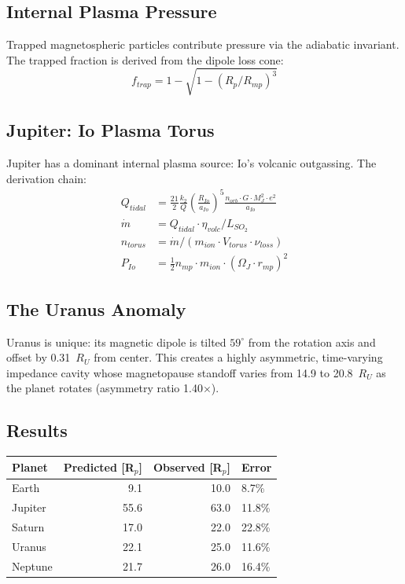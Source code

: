 \subsection{Internal Plasma Pressure}

Trapped magnetospheric particles contribute pressure via the adiabatic
invariant.  The trapped fraction is derived from the dipole loss cone:
\begin{equation}
    f_{trap} = 1 - \sqrt{1 - (R_p/R_{mp})^3}
\end{equation}

\subsection{Jupiter: Io Plasma Torus}

Jupiter has a dominant internal plasma source: Io's volcanic
outgassing.  The derivation chain:
\begin{align}
    Q_{tidal} &= \frac{21}{2}\frac{k_2}{Q}\left(\frac{R_{Io}}{a_{Io}}\right)^5
    \frac{n_{orb} \cdot G \cdot M_J^2 \cdot e^2}{a_{Io}} \\
    \dot{m} &= Q_{tidal} \cdot \eta_{volc} / L_{SO_2} \\
    n_{torus} &= \dot{m} / (m_{ion} \cdot V_{torus} \cdot \nu_{loss}) \\
    P_{Io} &= \frac{1}{2} n_{mp} \cdot m_{ion} \cdot (\Omega_J \cdot r_{mp})^2
\end{align}

\subsection{The Uranus Anomaly}

Uranus is unique: its magnetic dipole is tilted $59^\circ$ from
the rotation axis and offset by 0.31~$R_U$ from center.  This
creates a highly asymmetric, time-varying impedance cavity whose
magnetopause standoff varies from 14.9 to 20.8~$R_U$ as the
planet rotates (asymmetry ratio 1.40$\times$).

\subsection{Results}

\begin{center}
\small
\begin{tabular}{lrrl}
\toprule
\textbf{Planet} & \textbf{Predicted [R$_p$]} & \textbf{Observed [R$_p$]} & \textbf{Error} \\
\midrule
Earth   &  9.1 & 10.0 &  8.7\% \\
Jupiter & 55.6 & 63.0 & 11.8\% \\
Saturn  & 17.0 & 22.0 & 22.8\% \\
Uranus  & 22.1 & 25.0 & 11.6\% \\
Neptune & 21.7 & 26.0 & 16.4\% \\
\bottomrule
\end{tabular}
\end{center}

